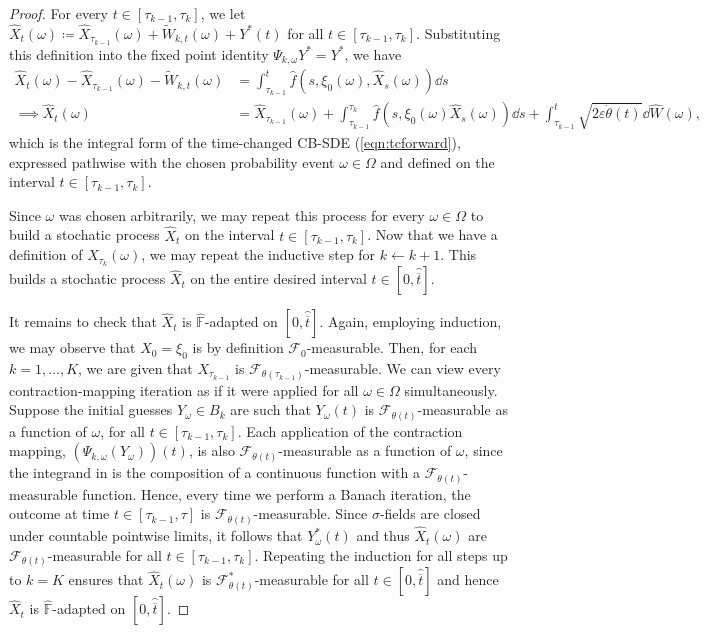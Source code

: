 \begin{proof}
  For every \(t \in [\tau_{k-1}, \tau_{k}]\), we let \(\hat{X}_{t}(\omega) \coloneqq \hat{X}_{\tau_{k-1}}(\omega) +  \widetilde{W}_{k, t}(\omega) + Y^{*}(t)\) for all \(t \in [\tau_{k-1}, \tau_{k}]\). Substituting this definition into the fixed point identity \(\Psi_{k, \omega} Y^{*} = Y^{*}\), we have
  \begin{align*}
    \hat{X}_{t}(\omega) - \hat{X}_{\tau_{k-1}}(\omega) - \widetilde{W}_{k, t}(\omega) &= \int_{\tau_{k-1}}^{t} \hat{f}(s, \xi_{0}(\omega), \hat{X}_{s}(\omega)) \dd{s} \\
    \implies \hat{X}_{t}(\omega) &= \hat{X}_{\tau_{k-1}}(\omega) +  \int_{\tau_{k-1}}^{\tau_{k}} \hat{f}(s, \xi_{0}(\omega) \hat{X}_{s}(\omega)) \dd{s} + \int_{\tau_{k-1}}^{t} \sqrt{2\varepsilon \dot{\theta}(t)} \dd{ \hat{W}(\omega)},
  \end{align*}
  which is the integral form of the time-changed CB-SDE (\ref{eqn:tcforward}), expressed pathwise with the chosen probability event \(\omega \in \Omega\) and defined on the interval \(t \in [\tau_{k-1}, \tau_{k}]\).

  Since \(\omega\) was chosen arbitrarily, we may repeat this process for every \(\omega \in \Omega\) to build a stochatic process \(\hat{X}_{t}\) on the interval \(t \in [\tau_{k-1}, \tau_{k}]\). Now that we have a definition of \(\hat{X}_{\tau_{k}}(\omega)\), we may repeat the inductive step for \(k \leftarrow k+1\). This builds a stochatic process \(\hat{X}_{t}\) on the entire desired interval \(t \in [ 0, \hat{\overline{t}}]\).

  It remains to check that \(\hat{X}_{t}\) is \(\hat{\mathbb{F}}\)-adapted on \([0, \hat{\overline{t}}]\). Again, employing induction, we may observe that \(X_{0} = \xi_{0}\) is by definition \(\mathcal{F}_{0}\)-measurable. Then, for each \(k = 1, \ldots, K\), we are given that \(X_{\tau_{k-1}}\) is \(\mathcal{F}_{ \theta(\tau_{k-1})}\)-measurable. We can view every contraction-mapping iteration as if it were applied for all \(\omega \in \Omega\) simultaneously. Suppose the initial guesses \(Y_{\omega} \in B_{k}\) are such that \(Y_{\omega}(t)\) is \(\mathcal{F}_{\theta(t)}\)-measurable as a function of \(\omega\), for all \(t \in [\tau_{k-1}, \tau_{k}]\). Each application of the contraction mapping, \((\Psi_{k,\omega}(Y_{\omega}))(t)\), is also \(\mathcal{F}_{\theta(t)}\)-measurable as a function of \(\omega\), since the integrand in  is the composition of a continuous function with a \(\mathcal{F}_{\theta(t)}\)-measurable function. Hence, every time we perform a Banach iteration, the outcome at time \(t \in [\tau_{k-1}, \tau]\) is \(\mathcal{F}_{\theta(t)}\)-measurable. Since \(\sigma\)-fields are closed under countable pointwise limits, it follows that \(Y^{*}_{\omega}(t)\) and thus \(\hat{X}_{t}(\omega)\) are \(\mathcal{F}_{\theta(t)}\)-measurable for all \(t \in [\tau_{k-1}, \tau_{k}]\). Repeating the induction for all steps up to \(k = K\) ensures that \(\hat{X}_{t}(\omega)\) is \(\mathcal{F}^{*}_{\theta(t)}\)-measurable for all \(t \in [0, \hat{\overline{t}}]\) and hence \(\hat{X}_{t}\) is \(\hat{\mathbb{F}}\)-adapted on \([0, \hat{\overline{t}}]\).


\end{proof}

